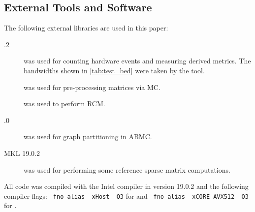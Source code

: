 \subsection{External Tools and Software}
The following external libraries are used in this paper:
\begin{description}
	\item[.2] \cite{LIKWID}  \likwidPerfctr was used for counting hardware events and measuring derived metrics. The bandwidths shown in \cref{tab:test_bed} were taken by the  \likwidBench tool.
	\item[\COLPACK] \cite{COLPACK} was used for pre-processing matrices via \acrshort{MC}.
	\item[\SPMP] \cite{SpMP} was used to perform \acrshort{RCM}.
	\item[.0] \cite{METIS} was used for graph partitioning in \acrshort{ABMC}.
	\item[\acrshort{MKL} 19.0.2] \cite{MKL} was used for performing some reference sparse matrix computations.
\end{description}
All code was compiled with the Intel compiler in version 19.0.2 and the following compiler flags: {\tt -fno-alias -xHost -O3} for \IVB and {\tt -fno-alias -xCORE-AVX512 -O3} for \SKX.

